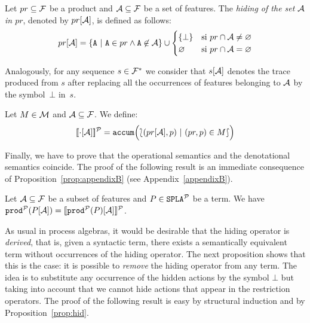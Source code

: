 \bdfn
  Let $pr\subseteq{\cal F}$ be a product and ${\cal A}\subseteq{\cal F}$
  be a set of features. The \emph{hiding of the set ${\cal A}$
    in $pr$}, denoted by $pr[{\cal A}]$, is defined as follows:
  \begin{displaymath}
    pr\hide{\calA} = \{\fA\ |\ \fA\in pr\wedge
    \fA\not\in\calA\}\cup
    \begin{cases}
      \{\bot\} & \mbox{si } pr\cap\calA\neq\emptyset\\
      \emptyset & \mbox{si } pr\cap\calA=\emptyset\\
    \end{cases}
  \end{displaymath}

  Analogously, for any sequence $s\in{\cal F}^{*}$ we consider that $s[{\cal A}]$ denotes the
  trace produced from $s$ after replacing all the occurrences of features belonging to ${\cal A}$ by the symbol~$\bot$ in~$s$.
\edfn

\bdfn
  Let $M\in{\cal M}$ and ${\cal A}\subseteq{\cal F}$. We define:
  \begin{displaymath}
    [\![\cdot[{\cal A}]]\!]^{\cal P} = \mathtt{accum}\Bigl(\lbag(pr[{\cal A}],p)\
    |\ (pr,p)\in M\rbag \Bigr)
  \end{displaymath}
\edfn

Finally, we have to prove that the
operational semantics and the denotational semantics coincide.
%
The proof of the following result is an immediate consequence of Proposition~\ref{prop:appendixB} (see Appendix~\ref{appendixB}).

\bprop\label{prop:hid}Let ${\cal A}\subseteq {\cal F}$ be a subset of features and
  $P\in\mathtt{SPLA{^{\cal P}}}$ be a term. We have $ \mathtt{prod}^{\cal P}(P[{\cal A}])  = [\![\mathtt{prod}^{\cal P}(P)[{\cal A}]]\!]^{\cal P}$.
\eprop

As usual in process algebras, it would be desirable that the hiding operator is \emph{derived}, that is, given a syntactic term, there exists a semantically equivalent term without occurrences of the hiding operator.
The next proposition shows that this is the case: it is possible to \emph{remove} the hiding
operator from any term. The idea is to substitute any occurrence of
the hidden actions by the symbol $\bot$ but taking into account  that we cannot
hide actions that appear in the restriction operators. The proof of the following result is easy by structural induction and by Proposition~\ref{prop:hid}.

